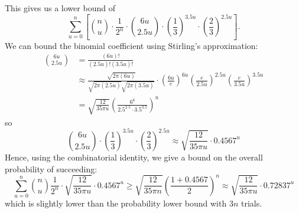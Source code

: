 \documentclass[11pt]{article}
\begin{document}
\begin{enumerate}[leftmargin=16pt]
\begin{enumerate}
        This gives us a lower bound of
        $$
        \sum_{u=0}^n \left[ \binom{n}{u} \cdot \frac{1}{2^n} \cdot \binom{6u}{2.5u} \cdot \left( \frac{1}{3} \right)^{3.5u} \cdot \left( \frac{2}{3} \right)^{2.5u} \right].
        $$
        We can bound the binomial coefficient using Stirling's approximation:
        $$
        \begin{aligned}
            \binom{6u}{2.5u} &= \frac{(6u)!}{(2.5u)! (3.5u)!} \\
            &\approx \frac{\sqrt{2\pi(6u)}}{\sqrt{2\pi(2.5u)} \sqrt{2\pi(3.5u)}} \cdot \left( \frac{6u}{e} \right)^{6u} \left( \frac{e}{2.5u} \right)^{2.5u} \left( \frac{e}{3.5u} \right)^{3.5u} \\
            &= \sqrt{\frac{12}{35\pi u}} \left( \frac{6^6}{2.5^{2.5} \cdot 3.5^{3.5}} \right)^u
        \end{aligned}
        $$
        so
        $$
        \binom{6u}{2.5u} \cdot \left( \frac{1}{3} \right)^{3.5u} \cdot \left( \frac{2}{3} \right)^{2.5u} \approx \sqrt{\frac{12}{35\pi u}} \cdot 0.4567^u
        $$
        Hence, using the combinatorial identity, we give a bound on the overall probability of succeeding:
        $$
        \sum_{u=0}^n \binom{n}{u} \frac{1}{2^n} \cdot \sqrt{\frac{12}{35\pi u}} \cdot 0.4567^u \geq \sqrt{\frac{12}{35\pi n}} \left(\frac{1+0.4567}{2}\right)^n \approx \sqrt{\frac{12}{35\pi u}} \cdot 0.72837^u
        $$
        which is slightly lower than the probability lower bound with $3n$ trials.
    \end{enumerate}
\end{enumerate}
\end{document}
